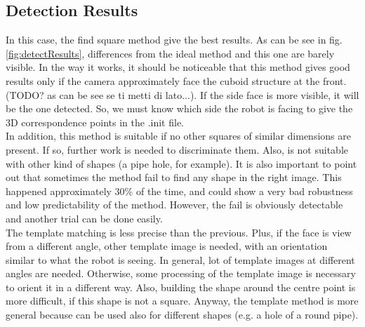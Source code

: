 \subsection{Detection Results}
\label{subsec:detectResult}
In this case, the find square method give the best results. As can be see in fig. \ref{fig:detectResults}, differences from the ideal method and this one are barely visible.
In the way it works, it should be noticeable that this method gives good results only if the camera approximately face the cuboid structure at the front. (TODO? as can be see se ti metti di lato...). If the side face is more visible, it will be the one detected. So, we must know which side the robot is facing to give the 3D correspondence points in the .init file.\\
In addition, this method is suitable if no other squares of similar dimensions are present. If so, further work is needed to discriminate them. Also, is not suitable with other kind of shapes (a pipe hole, for example). It is also important to point out that sometimes the method fail to find any shape in the right image. This happened approximately 30\% of the time, and could show a very bad robustness and low predictability of the method. However, the fail is obviously detectable and another trial can be done easily.\\
The template matching is less precise than the previous. Plus, if the face is view from a different angle, other template image is needed, with an orientation similar to what the robot is seeing. In general, lot of template images at different angles are needed. Otherwise, some processing of the template image is necessary to orient it in a different way. Also, building the shape around the centre point is more difficult, if this shape is not a square. Anyway, the template method is more general because can be used also for different shapes (e.g. a hole of a round pipe).


